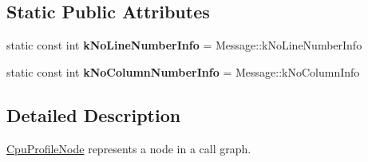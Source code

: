 \subsection*{Static Public Attributes}
\begin{DoxyCompactItemize}
\item 
\hypertarget{classv8_1_1CpuProfileNode_ad54213fe8a795cb6669566f0272fc5ba}{static const int {\bfseries k\-No\-Line\-Number\-Info} = Message\-::k\-No\-Line\-Number\-Info}\label{classv8_1_1CpuProfileNode_ad54213fe8a795cb6669566f0272fc5ba}

\item 
\hypertarget{classv8_1_1CpuProfileNode_a7c8c1dea3ae0cf4c219b7b1f15a8405b}{static const int {\bfseries k\-No\-Column\-Number\-Info} = Message\-::k\-No\-Column\-Info}\label{classv8_1_1CpuProfileNode_a7c8c1dea3ae0cf4c219b7b1f15a8405b}

\end{DoxyCompactItemize}


\subsection{Detailed Description}
\hyperlink{classv8_1_1CpuProfileNode}{Cpu\-Profile\-Node} represents a node in a call graph. 

